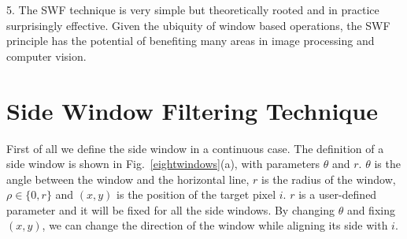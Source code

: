\documentclass[10pt,twocolumn,letterpaper]{article}
\begin{document}
5. The SWF technique is very simple but theoretically rooted and in practice surprisingly effective. Given the ubiquity of window based operations, the SWF principle has the potential of benefiting many areas in image processing and computer vision.  



\begin{figure*}[htbp] 
	\centering
	\caption{Definition of side window. $r$ is the radius of the window. (a) The definition of side window in continuous case. (b) The $left$ (red rectangle) and $right$ (blue rectangle) side windows. (c) The $up$ (red rectangle) and $down$ (blue rectangle) side windows. (d) The $northwest$ (red rectangle), $northeast$ (blue rectangle), $southwest$ (green rectangle) and $southeast$ (orange rectangle) side windows.}
	\label{eightwindows}
\end{figure*}





\section{Side Window Filtering Technique}
First of all we define the side window in a continuous case. The definition of a side window is shown in Fig.~\ref{eightwindows}(a), with parameters $\theta$ and $r$. $\theta$ is the angle between the window and the horizontal line, $r$ is the radius of the window, $\rho\in\{0, r\}$ and $(x,y)$ is the position of the target pixel $i$. $r$ is a user-defined parameter and it will be fixed for all the side windows. By changing $\theta$ and fixing $(x,y)$, we can change the direction of the window while aligning its side with $i$. 
\end{document}

